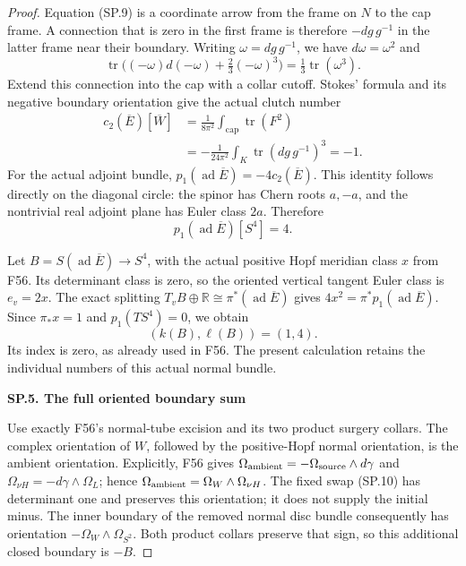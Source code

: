 \begin{proof}
Equation (SP.9) is a coordinate arrow from the frame on \(N\) to
the cap frame. A connection that is zero in the first frame is
therefore \(-dg\,g^{-1}\) in the latter frame near their boundary.
Writing \(\omega=dg\,g^{-1}\), we have
\(d\omega=\omega^2\) and
\[
 \operatorname{tr}\bigl((-\omega)d(-\omega)
                    +\tfrac23(-\omega)^3\bigr)
                    =\tfrac13\operatorname{tr}(\omega^3).
\]
Extend this connection into the cap with a collar cutoff. Stokes'
formula and its negative boundary orientation give the actual
clutch number
\[
 \begin{aligned}
 c_2(\overline E)[\overline W]
    &=\frac1{8\pi^2}\int_{\text{cap}}\operatorname{tr}(F^2)\\
    &=-\frac1{24\pi^2}
                       \int_K\operatorname{tr}(dg\,g^{-1})^3=-1.
 \end{aligned}                                             \tag{SP.18}
\]
For the actual adjoint bundle,
\(p_1(\operatorname{ad}\overline E)=-4c_2(\overline E)\).
This identity follows directly on the diagonal circle: the spinor
has Chern roots \(a,-a\), and the nontrivial real adjoint plane has
Euler class \(2a\). Therefore
\[
             p_1(\operatorname{ad}\overline E)[S^4]=4.    \tag{SP.19}
\]

Let \(B=S(\operatorname{ad}\overline E)\to S^4\), with the
actual positive Hopf meridian class \(x\) from F56. Its determinant
class is zero, so the oriented vertical tangent Euler class is
\(e_v=2x\). The exact splitting
\(T_vB\oplus\mathbb R\cong\pi^*(\operatorname{ad}\overline E)\)
gives \(4x^2=\pi^*p_1(\operatorname{ad}\overline E)\).
Since \(\pi_*x=1\) and \(p_1(TS^4)=0\), we obtain
\[
                         (k(B),\ell(B))=(1,4).             \tag{SP.20}
\]
Its index is zero, as already used in F56. The present calculation
retains the individual numbers of this actual normal bundle.

\par

\medskip\noindent\textbf{SP.5. The full oriented boundary sum}

\par\nobreak

Use exactly F56's normal-tube excision and its two product surgery
collars. The complex orientation of \(W\), followed by the
positive-Hopf normal orientation, is the ambient orientation.
Explicitly, F56 gives
\(\Omega_{\rm ambient}=-\Omega_{\rm source}\wedge d\gamma\)
and
\(\Omega_{\nu H}=-d\gamma\wedge\Omega_L\); hence
\(\Omega_{\rm ambient}=\Omega_W\wedge\Omega_{\nu H}\).
The fixed swap (SP.10) has determinant one and preserves this
orientation; it does not supply the initial minus. The inner
boundary of the removed normal disc bundle consequently has
orientation
\(-\Omega_W\wedge\Omega_{S^2}\). Both product collars preserve
that sign, so this additional closed boundary is \(-B\).


\end{proof}
